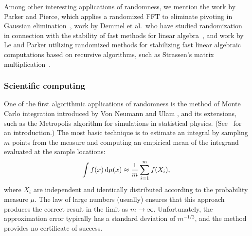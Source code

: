 \documentclass[final]{siamltex}
\newcounter{algorithm}[section]
\newcommand{\pgnotate}[1]{{\color{blue}[#1]}}
\begin{document}
Among other interesting applications of randomness, we mention
the work by Parker and Pierce, which applies a randomized FFT to
eliminate pivoting in Gaussian elimination~\cite{PP95:Randomizing-FFT},
work by Demmel et al.~who have studied randomization
in connection with the stability of fast methods for
linear algebra~\cite{DDH07:Fast-Linear}, and work by Le and Parker
utilizing randomized methods for stabilizing fast linear algebraic
computations based on recursive algorithms, such as Strassen's matrix
multiplication~\cite{Le_Parker_1999}.



\subsubsection{Scientific computing}

One of the first algorithmic applications of randomness
is the method of Monte Carlo integration
introduced by Von Neumann and Ulam \cite{metropolis_ulam}, and its
extensions, such as the Metropolis algorithm for simulations in
statistical physics. (See~\cite{Bei00:Metropolis-Algorithm} for an introduction.)
The most basic technique is to estimate an integral by sampling $m$ points from the
measure and computing an empirical mean of the integrand evaluated
at the sample locations:
$$
\int f(x) \, \mathrm{d}{\mu}(x) \approx \frac{1}{m} \sum_{i=1}^m f(X_i),
$$
where $X_i$ are independent and identically distributed according to
the probability measure $\mu$. The law of large numbers (usually)
ensures that this approach produces the correct result in the limit
as $m \to \infty$.  Unfortunately, the approximation error typically
has a standard deviation of $m^{-1/2}$, and the method provides
no certificate of success.
\end{document}
